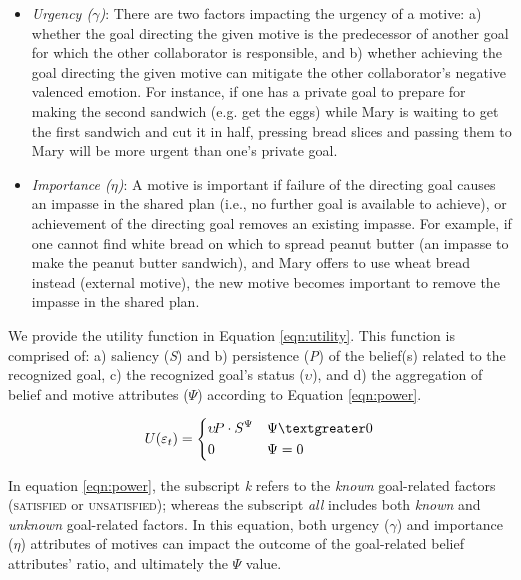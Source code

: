 \documentclass{article}
\begin{document}
\vspace*{-1mm}
\begin{itemize}[leftmargin=2pt]
  \setlength\itemsep{0.05mm}
  \item \textit{Urgency ($\gamma$)}: There are two factors impacting the urgency
  of a motive: a) whether the goal directing the given motive is the predecessor of
  another goal for which the other collaborator is responsible, and b) whether
  achieving the goal directing the given motive can mitigate the other
  collaborator's negative valenced emotion. For instance, if one has a private
  goal to prepare for making the second sandwich (e.g. get the eggs) while Mary
  is waiting to get the first sandwich and cut it in half, pressing bread slices
  and passing them to Mary will be more urgent than one's private goal.
  \item \textit{Importance ($\eta$)}: A motive is important if failure of the
  directing goal causes an impasse in the shared plan (i.e., no further goal is
  available to achieve), or achievement of the directing goal removes an
  existing impasse. For example, if one cannot find white bread on which to
  spread peanut butter (an impasse to make the peanut butter sandwich), and Mary
  offers to use wheat bread instead (external motive), the new motive becomes
  important to remove the impasse in the shared plan.
\end{itemize}

We provide the utility function in Equation \ref{eqn:utility}. This function is
comprised of: a) saliency (\textit{S}) and b) persistence (\textit{P}) of the
belief(s) related to the recognized goal, c) the recognized goal's status
($\upsilon$), and d) the aggregation of belief and motive attributes ($\Psi$)
according to Equation \ref{eqn:power}.

\vspace*{-3mm}
\begin{equation}
    U(\varepsilon_t)= 
    \begin{dcases}
       \upsilon\!P\cdot S^{\Psi} & \Psi \textgreater 0 \\
       0               			 & \Psi = 0
    \end{dcases}
    \label{eqn:utility}
\end{equation}

\vspace*{-1mm}
In equation \ref{eqn:power}, the subscript \textit{k} refers to the
\textit{known} goal-related factors (\textsc{satisfied} or
\textsc{unsatisfied}); whereas the subscript \textit{all} includes both
\textit{known} and \textit{unknown} goal-related factors. In this equation, both
urgency ($\gamma$) and importance ($\eta$) attributes of motives can impact the
outcome of the goal-related belief attributes' ratio, and ultimately the $\Psi$
value.
\end{document}
